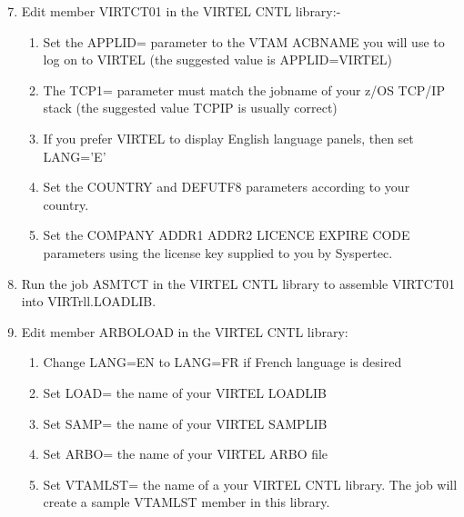 \documentclass[letterpaper,10pt,english]{sphinxmanual}
\begin{document}
\begin{sphinxVerbatim}[commandchars=\\\{\}]
 
\end{sphinxVerbatim}
\begin{enumerate}
\setcounter{enumi}{6}
\item {} 
Edit member VIRTCT01 in the VIRTEL CNTL library:-
\begin{enumerate}
\item {} 
Set the APPLID= parameter to the VTAM ACBNAME you will use to log on to VIRTEL (the suggested value is APPLID=VIRTEL)

\item {} 
The TCP1= parameter must match the jobname of your z/OS TCP/IP stack (the suggested value TCPIP is usually correct)

\item {} 
If you prefer VIRTEL to display English language panels, then set LANG=’E’

\item {} 
Set the COUNTRY and DEFUTF8 parameters according to your country.

\item {} 
Set the COMPANY ADDR1 ADDR2 LICENCE EXPIRE CODE parameters using the license key supplied to you by Syspertec.

\end{enumerate}

\item {} 
Run the job ASMTCT in the VIRTEL CNTL library to assemble VIRTCT01 into VIRTrll.LOADLIB.

\item {} 
Edit member ARBOLOAD in the VIRTEL CNTL library:
\begin{enumerate}
\item {} 
Change LANG=EN to LANG=FR if French language is desired

\item {} 
Set LOAD= the name of your VIRTEL LOADLIB

\item {} 
Set SAMP= the name of your VIRTEL SAMPLIB

\item {} 
Set ARBO= the name of your VIRTEL ARBO file

\item {} 
Set VTAMLST= the name of a your VIRTEL CNTL library. The job will create a sample VTAMLST member in this library.


\end{enumerate}
\end{enumerate}
\end{document}
